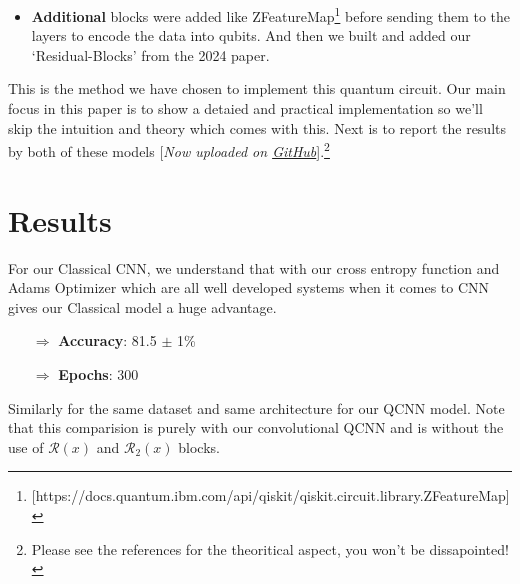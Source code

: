 \documentclass[a4paper]{article}
\begin{document}
\begin{itemize}
\begin{figure}[h]
\begin{subfigure}{.2\textwidth}
  \caption{$\mathcal{R}_2(x)$}
  \label{fig:sub2}
\end{subfigure}%
\begin{subfigure}{.2\textwidth}
  \centering
  \texttt{[image: assets/conv\\\_element.png]}
  \caption{$C$ Layer element}
  \label{fig:sub2}
\end{subfigure}%
\begin{subfigure}{.2\textwidth}
  \centering
  \texttt{[image: assets/pool\\\_element.png]}
  \caption{$P$ Layer element}
  \label{fig:sub2}
\end{subfigure}%
\label{fig:test}
\end{figure}
\item \textbf{Additional} blocks were added like ZFeatureMap\footnote{[https://docs.quantum.ibm.com/api/qiskit/qiskit.circuit.library.ZFeatureMap]} before sending them to the layers to encode the data into qubits. And then we built and added our `Residual-Blocks' from the 2024 paper.
\end{itemize}
This is the method we have chosen to implement this quantum circuit. Our main focus in this paper is to show a detaied and practical implementation so we'll skip the intuition and theory which comes with this. Next is to report the results by both of these models [\emph{Now uploaded on \href{https://github.com/f361015/Quantum-CNN-TicTacToe}{GitHub}}].\footnote{Please see the references for the theoritical aspect, you won't be dissapointed!}

\section*{Results}

For our Classical CNN, we understand that with our cross entropy function and Adams Optimizer which are all well developed systems when it comes to CNN gives our Classical model a huge advantage.

\begin{itemize}
\item[$\Rightarrow$] \textbf{Accuracy}: 81.5 $\pm$ 1\%
\item[$\Rightarrow$] \textbf{Epochs}: 300
\end{itemize}

Similarly for the same dataset and same architecture for our QCNN model. Note that this comparision is purely with our convolutional QCNN and is without the use of $\mathcal{R}(x)$ and $\mathcal{R}_2(x)$ blocks.
\end{document}
